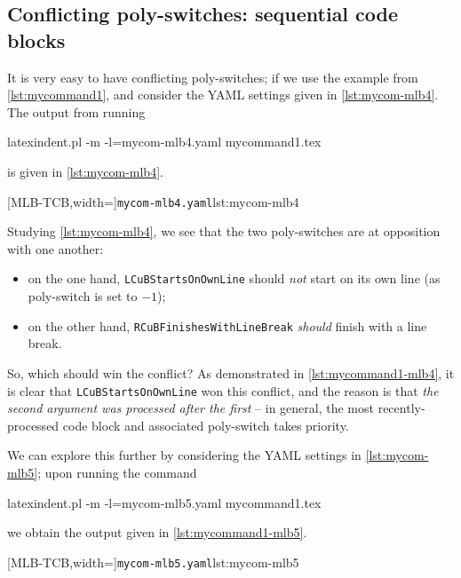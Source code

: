 \subsection{Conflicting poly-switches: sequential code blocks}
	It is very easy to have conflicting poly-switches; if we use the example from \vref{lst:mycommand1},
	and consider the YAML settings given in \cref{lst:mycom-mlb4}. The output from running
	\begin{commandshell}
latexindent.pl -m -l=mycom-mlb4.yaml mycommand1.tex
\end{commandshell}
	is given in \cref{lst:mycom-mlb4}.

	\begin{minipage}{.4\linewidth}
	\end{minipage}
	\hfill
	\begin{minipage}{.55\linewidth}
		[MLB-TCB,width=\linewidth]{\texttt{mycom-mlb4.yaml}}{lst:mycom-mlb4}
	\end{minipage}

	Studying \cref{lst:mycom-mlb4}, we see that the two poly-switches are at opposition with one another:
	\begin{itemize}
		\item on the one hand, \texttt{LCuBStartsOnOwnLine} should \emph{not} start on its own line (as poly-switch is set to $-1$);
		\item on the other hand, \texttt{RCuBFinishesWithLineBreak} \emph{should} finish with a line break.
	\end{itemize}
	So, which should win the conflict? As demonstrated in \cref{lst:mycommand1-mlb4}, it is clear that \texttt{LCuBStartsOnOwnLine} won
	this conflict, and the reason is that \emph{the second argument was processed after the first} -- in general, the most recently-processed
	code block and associated poly-switch takes priority.

	We can explore this further by considering the YAML settings in \cref{lst:mycom-mlb5}; upon running the command
	\begin{commandshell}
latexindent.pl -m -l=mycom-mlb5.yaml mycommand1.tex
\end{commandshell}
	we obtain the output given in \cref{lst:mycommand1-mlb5}.

	\begin{minipage}{.4\linewidth}
	\end{minipage}
	\hfill
	\begin{minipage}{.55\linewidth}
		[MLB-TCB,width=\linewidth]{\texttt{mycom-mlb5.yaml}}{lst:mycom-mlb5}
	\end{minipage}


